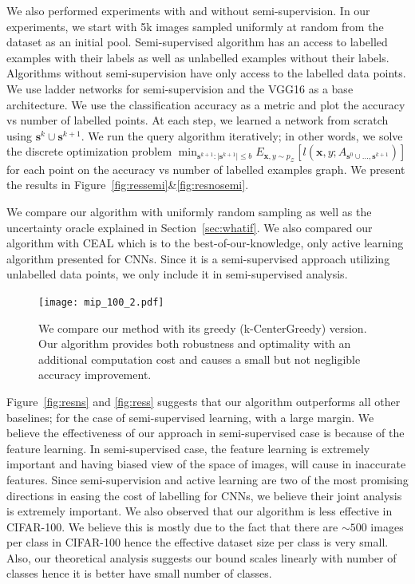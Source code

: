\documentclass{article}
\begin{document}
We also performed experiments with and without semi-supervision. In our experiments, we start with 5k images sampled uniformly at random from the dataset as an initial pool. Semi-supervised algorithm has an access to labelled examples with their labels as well as unlabelled examples without their labels. Algorithms without semi-supervision have only access to the labelled data points. We use ladder networks\cite{ladder} for semi-supervision and the VGG16\cite{vgg} as a base architecture. We use the classification accuracy as a metric and plot the accuracy vs number of labelled points. At each step, we learned a network from scratch using $\mathbf{s}^{k} \cup \mathbf{s}^{k+1}$. We run the query algorithm iteratively; in other words, we solve the discrete optimization problem $\min_{\mathbf{s}^{k+1} : |\mathbf{s}^{k+1}| \leq b} E_{\mathbf{x},y \sim p_\mathcal{Z}} [l(\mathbf{x},y; A_{\mathbf{s}^{0} \cup \ldots, \mathbf{s}^{k+1}})]$ for each point on the accuracy vs number of labelled examples graph. We present the results in Figure~\ref{fig:ressemi}\&\ref{fig:resnosemi}.

We compare our algorithm with uniformly random sampling as well as the uncertainty oracle explained in Section~\ref{sec:whatif}. We also compared our algorithm with CEAL \cite{wang2016cost} which is to the best-of-our-knowledge, only active learning algorithm presented for CNNs. Since it is a semi-supervised approach utilizing unlabelled data points, we only include it in semi-supervised analysis.

 \begin{figure}
\texttt{[image: mip\_100\_2.pdf]}
\caption{We compare our method with its greedy (k-CenterGreedy) version. Our algorithm provides both robustness and optimality with an additional computation cost and causes a small but not negligible accuracy improvement. }
\label{fig:twoopt}
\end{figure}

Figure~\ref{fig:resns} and \ref{fig:ress} suggests that our algorithm outperforms all other baselines; for the case of semi-supervised learning, with a large margin. We believe the effectiveness of our approach in semi-supervised case is because of the feature learning. In semi-supervised case, the feature learning is extremely important and having biased view of the space of images, will cause in inaccurate features. Since semi-supervision and active learning are two of the most promising directions in easing the cost of labelling for CNNs, we believe their joint analysis is extremely important. We also observed that our algorithm is less effective in CIFAR-100. We believe this is mostly due to the fact that there are $\sim500$ images per class in CIFAR-100 hence the effective dataset size per class is very small. Also, our theoretical analysis suggests our bound scales linearly with number of classes hence it is better have small number of classes.
\end{document}
